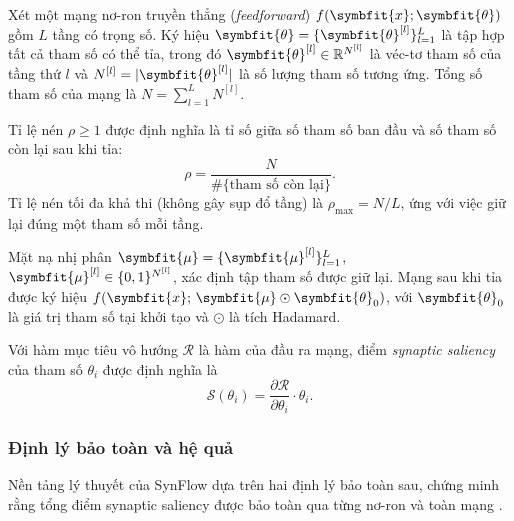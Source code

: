 Xét một mạng nơ-ron truyền thẳng (\emph{feedforward}) $f(\symbfit{x};\symbfit{\theta})$
gồm $L$ tầng có trọng số. Ký hiệu $\symbfit{\theta} = \{\symbfit{\theta}^{[l]}\}_{l=1}^{L}$
là tập hợp tất cả tham số có thể tỉa, trong đó $\symbfit{\theta}^{[l]} \in
    \mathbb{R}^{N^{[l]}}$ là véc-tơ tham số của tầng thứ $l$ và
$N^{[l]} = |\symbfit{\theta}^{[l]}|$ là số lượng tham số tương ứng. Tổng số
tham số của mạng là $N = \sum_{l=1}^{L} N^{[l]}$.

\begin{definition}[Tỉ lệ nén]
    Tỉ lệ nén $\rho \geq 1$ được định nghĩa là tỉ số giữa số tham số ban đầu và
    số tham số còn lại sau khi tỉa:
    \[
        \rho = \frac{N}{\#\{\text{tham số còn lại}\}}.
    \]
    Tỉ lệ nén tối đa khả thi (không gây sụp đổ tầng) là
    $\rho_{\max} = N/L$, ứng với việc giữ lại đúng một tham số mỗi tầng.
\end{definition}

\begin{definition}
    Mặt nạ nhị phân $\symbfit{\mu} = \{\symbfit{\mu}^{[l]}\}_{l=1}^{L}$,
    $\symbfit{\mu}^{[l]} \in \{0,1\}^{N^{[l]}}$, xác định tập tham số được giữ
    lại. Mạng sau khi tỉa được ký hiệu $f(\symbfit{x};\, \symbfit{\mu} \odot
        \symbfit{\theta}_0)$, với $\symbfit{\theta}_0$ là giá trị tham số tại khởi tạo
    và $\odot$ là tích Hadamard.
\end{definition}

\begin{definition}
    \label{def:saliency}
    Với hàm mục tiêu vô hướng $\mathcal{R}$ là hàm của đầu ra mạng, điểm
    \emph{synaptic saliency} của tham số $\theta_i$ được định nghĩa là
    \begin{equation}
        \mathcal{S}(\theta_i) = \frac{\partial \mathcal{R}}{\partial \theta_i}
        \cdot \theta_i.
        \label{eq:saliency}
    \end{equation}
\end{definition}

\subsubsection{\textbf{Định lý bảo toàn và hệ quả}}

Nền tảng lý thuyết của SynFlow dựa trên hai định lý bảo toàn sau, chứng minh
rằng tổng điểm synaptic saliency được bảo toàn qua từng nơ-ron và toàn mạng
\cite{synflow}.

